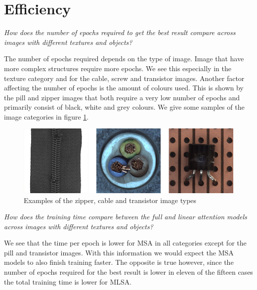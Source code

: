\section{Efficiency}
\label{sec:results:efficiency}

\textit{How does the number of epochs required to get the best result compare across images with different textures and objects?}\

The number of epochs required depends on the type of image. Image that have more complex structures require more epochs. We see this especially in the texture category and for the cable, screw and transistor images. Another factor affecting the number of epochs is the amount of colours used. This is shown by the pill and zipper images that both require a very low number of epochs and primarily consist of black, white and grey colours. We give some samples of the image categories in figure \ref{fig:results:detail-samples}.

\begin{figure}[ht!]
\centering
\includegraphics[width=\textwidth]{imgs/samples/image-detail-sample.jpg}
\caption{Examples of the zipper, cable and transistor image types}
\label{fig:results:detail-samples}
\end{figure}

\textit{How does the training time compare between the full and linear attention models across images with different textures and objects?}\

We see that the time per epoch is lower for MSA in all categories except for the pill and transistor images. With this information we would expect the MSA models to also finish training faster. The opposite is true however, since the number of epochs required for the best result is lower in eleven of the fifteen cases the total training time is lower for MLSA.

